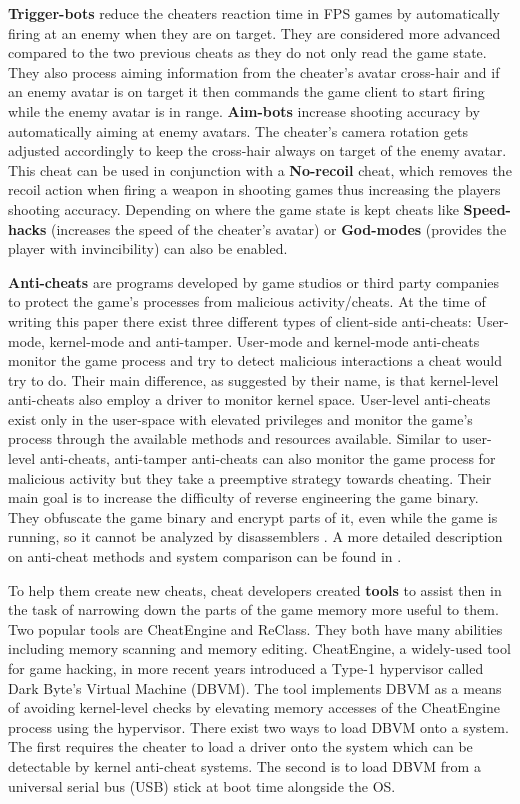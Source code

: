 \textbf{Trigger-bots} reduce the cheaters reaction time in FPS games by automatically firing at an enemy when they are on target. They are considered more advanced compared to the two previous cheats as they do not only read the game state. They also process aiming information from the cheater’s avatar cross-hair and if an enemy avatar is on target it then commands the game client to start firing while the enemy avatar is in range.
\textbf{Aim-bots} increase shooting accuracy by automatically aiming at enemy avatars. The cheater's camera rotation gets adjusted accordingly to keep the cross-hair always on target of the enemy avatar. This cheat can be used in conjunction with a \textbf{No-recoil} cheat, which removes the recoil action when firing a weapon in shooting games thus increasing the players shooting accuracy. Depending on where the game state is kept cheats like \textbf{Speed-hacks} (increases the speed of the cheater's avatar) or \textbf{God-modes} (provides the player with invincibility) can also be enabled. 


\textbf{Anti-cheats} are programs developed by game studios or third party companies to protect the game's processes from malicious activity/cheats.  At the time of writing this paper there exist three different types of client-side anti-cheats: User-mode, kernel-mode and anti-tamper. User-mode and kernel-mode anti-cheats monitor the game process and try to detect malicious interactions a cheat would try to do. 
Their main difference, as suggested by their name, is that kernel-level anti-cheats also employ a driver to monitor kernel space. User-level anti-cheats exist only in the user-space with elevated privileges and monitor the game's process through the available methods and resources available. Similar to user-level anti-cheats, anti-tamper anti-cheats can also monitor the game process for malicious activity but they take a preemptive strategy towards cheating. Their main goal is to increase the difficulty of reverse engineering the game binary. They obfuscate the game binary and encrypt parts of it, even while the game is running, so it cannot be analyzed by disassemblers \cite{androidObfuscation,balakrishnan2005code,you2010malware}. A more detailed description on anti-cheat methods and system comparison can be found in \cite{bohnerthanti}.

To help them create new cheats, cheat developers created \textbf{tools} to assist then in the task of narrowing down the parts of the game memory more useful to them. Two popular tools are CheatEngine\cite{cheatEngine} and ReClass\cite{reClass}. They both have many abilities including memory scanning and memory editing. CheatEngine, a widely-used tool for game hacking, in more recent years introduced a Type-1 hypervisor called Dark Byte's Virtual Machine (DBVM). The tool implements DBVM as a means of avoiding kernel-level checks by elevating memory accesses of the CheatEngine process using the hypervisor. There exist two ways to load DBVM onto a system. The first requires the cheater to load a driver onto the system which can be detectable by kernel anti-cheat systems. The second is to load DBVM from a universal serial bus (USB) stick at boot time alongside the OS. 


